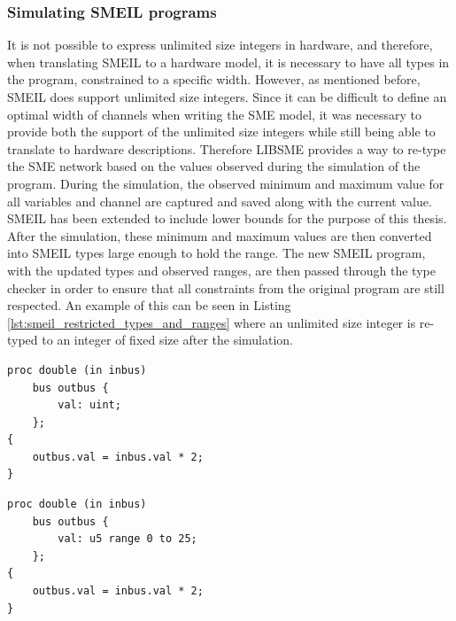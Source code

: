 \subsubsection{Simulating SMEIL programs}
It is not possible to express unlimited size integers in hardware, and therefore,
when translating SMEIL to a hardware model, it is necessary to have all types in the program, constrained to a specific width.
However, as mentioned before, SMEIL does support unlimited size integers. Since it can be difficult to define an optimal width of channels when writing the SME model, it was necessary to provide both the support of the unlimited size integers while still being able to translate to hardware descriptions.
Therefore LIBSME provides a way to re-type the SME network based on the values observed during the simulation of the program.
During the simulation, the observed minimum and maximum value for all variables and channel are captured and saved along with the current value. SMEIL has been extended to include lower bounds for the purpose of this thesis.
After the simulation, these minimum and maximum values are then converted into SMEIL types large enough to hold the range.
The new SMEIL program, with the updated types and observed ranges, are then passed through the type checker in order to ensure that all constraints from the original program are still respected.
An example of this can be seen in Listing \ref{lst:smeil_restricted_types_and_ranges} where an unlimited size integer is re-typed to an integer of fixed size after the simulation.\\
\begin{minipage}[t]{.98\linewidth}
  \begin{minipage}[t]{0.45\linewidth}
    \begin{verbatim}
proc double (in inbus)
    bus outbus {
        val: uint;
    };
{
    outbus.val = inbus.val * 2;
}
    \end{verbatim}
    \label{lst:unconstrained_smeil_type}
  \end{minipage}
  \hspace{0.5cm}
  \begin{minipage}[t]{0.45\linewidth}
    \begin{verbatim}
proc double (in inbus)
    bus outbus {
        val: u5 range 0 to 25;
    };
{
    outbus.val = inbus.val * 2;
}
    \end{verbatim}
    \label{lst:constrained_smeil_type}
  \end{minipage}
    \vspace{0.5cm}
   \label{lst:smeil_restricted_types_and_ranges}
   \vspace{1cm}
\end{minipage}
